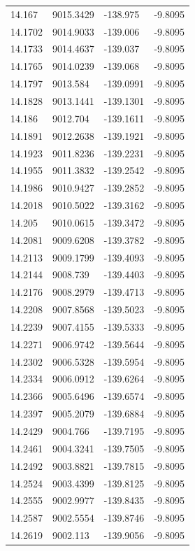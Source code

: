 \begin{table}[H]
\begin{tabular}{llll}
14.167 & 9015.3429 & -138.975 & -9.8095 \\
14.1702 & 9014.9033 & -139.006 & -9.8095 \\
14.1733 & 9014.4637 & -139.037 & -9.8095 \\
14.1765 & 9014.0239 & -139.068 & -9.8095 \\
14.1797 & 9013.584 & -139.0991 & -9.8095 \\
14.1828 & 9013.1441 & -139.1301 & -9.8095 \\
14.186 & 9012.704 & -139.1611 & -9.8095 \\
14.1891 & 9012.2638 & -139.1921 & -9.8095 \\
14.1923 & 9011.8236 & -139.2231 & -9.8095 \\
14.1955 & 9011.3832 & -139.2542 & -9.8095 \\
14.1986 & 9010.9427 & -139.2852 & -9.8095 \\
14.2018 & 9010.5022 & -139.3162 & -9.8095 \\
14.205 & 9010.0615 & -139.3472 & -9.8095 \\
14.2081 & 9009.6208 & -139.3782 & -9.8095 \\
14.2113 & 9009.1799 & -139.4093 & -9.8095 \\
14.2144 & 9008.739 & -139.4403 & -9.8095 \\
14.2176 & 9008.2979 & -139.4713 & -9.8095 \\
14.2208 & 9007.8568 & -139.5023 & -9.8095 \\
14.2239 & 9007.4155 & -139.5333 & -9.8095 \\
14.2271 & 9006.9742 & -139.5644 & -9.8095 \\
14.2302 & 9006.5328 & -139.5954 & -9.8095 \\
14.2334 & 9006.0912 & -139.6264 & -9.8095 \\
14.2366 & 9005.6496 & -139.6574 & -9.8095 \\
14.2397 & 9005.2079 & -139.6884 & -9.8095 \\
14.2429 & 9004.766 & -139.7195 & -9.8095 \\
14.2461 & 9004.3241 & -139.7505 & -9.8095 \\
14.2492 & 9003.8821 & -139.7815 & -9.8095 \\
14.2524 & 9003.4399 & -139.8125 & -9.8095 \\
14.2555 & 9002.9977 & -139.8435 & -9.8095 \\
14.2587 & 9002.5554 & -139.8746 & -9.8095 \\
14.2619 & 9002.113 & -139.9056 & -9.8095 \\

\end{tabular}
\end{table}
